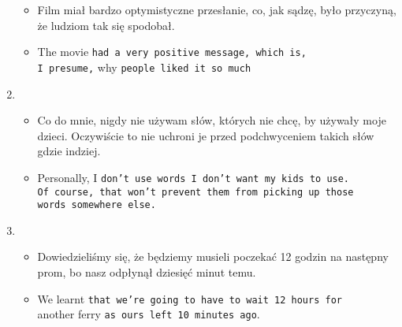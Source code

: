 \documentclass[a4paper]{article}
\begin{document}
\begin{enumerate}
\begin{itemize}
        \item Film miał bardzo optymistyczne przesłanie, co, jak sądzę, było przyczyną, że ludziom tak się spodobał.
        \item The movie {\tt had a very positive message, which is,\\I presume,} why {\tt people liked it so much}
    \end{itemize}
    \item \begin{itemize}
        \item Co do mnie, nigdy nie używam słów, których nie chcę, by używały moje dzieci. Oczywiście to nie uchroni je przed podchwyceniem takich słów gdzie indziej.
        \item Personally, I {\tt don't use words I don't want my kids to use.\\Of course, that won't prevent them from picking up those\\words somewhere else.}
    \end{itemize}
    \item \begin{itemize}
        \item Dowiedzieliśmy się, że będziemy musieli poczekać 12 godzin na następny prom, bo nasz odpłynął dziesięć minut temu.
        \item We learnt {\tt that we're going to have to wait 12 hours for}\\another ferry {\tt as ours left 10 minutes ago}.
    \end{itemize}
\end{enumerate}
\pagebreak
\end{document}
